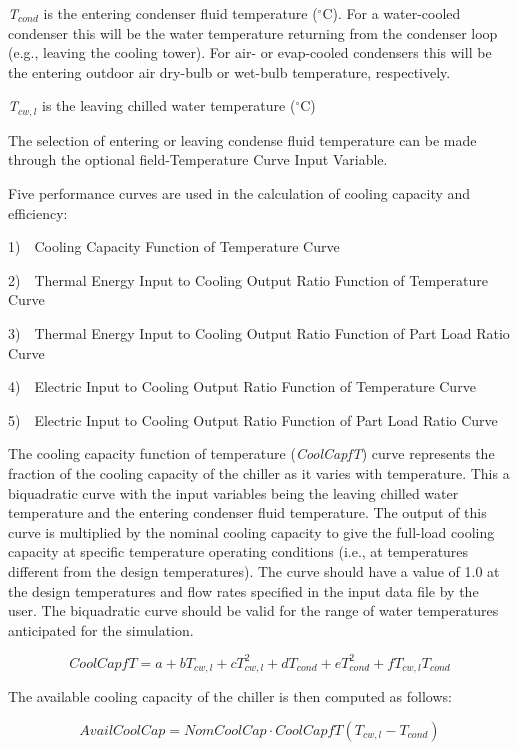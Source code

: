 \emph{T\(_{cond}\)} is the entering condenser fluid temperature (\(^{\circ}\)C). For a water-cooled condenser this will be the water temperature returning from the condenser loop (e.g., leaving the cooling tower). For air- or evap-cooled condensers this will be the entering outdoor air dry-bulb or wet-bulb temperature, respectively.

\emph{T\(_{cw,l}\)} is the leaving chilled water temperature (\(^{\circ}\)C)

The selection of entering or leaving condense fluid temperature can be made through the optional field-Temperature Curve Input Variable.

Five performance curves are used in the calculation of cooling capacity and efficiency:

1)~~Cooling Capacity Function of Temperature Curve

2)~~Thermal Energy Input to Cooling Output Ratio Function of Temperature Curve

3)~~Thermal Energy Input to Cooling Output Ratio Function of Part Load Ratio Curve

4)~~Electric Input to Cooling Output Ratio Function of Temperature Curve

5)~~Electric Input to Cooling Output Ratio Function of Part Load Ratio Curve

The cooling capacity function of temperature (\emph{CoolCapfT}) curve represents the fraction of the cooling capacity of the chiller as it varies with temperature. This a biquadratic curve with the input variables being the leaving chilled water temperature and the entering condenser fluid temperature. The output of this curve is multiplied by the nominal cooling capacity to give the full-load cooling capacity at specific temperature operating conditions (i.e., at temperatures different from the design temperatures). The curve should have a value of 1.0 at the design temperatures and flow rates specified in the input data file by the user. The biquadratic curve should be valid for the range of water temperatures anticipated for the simulation.

\begin{equation}
CoolCapfT = a + b{T_{cw,l}} + cT_{cw,l}^2 + d{T_{cond}} + eT_{cond}^2 + f{T_{cw,l}}{T_{cond}}
\end{equation}

The available cooling capacity of the chiller is then computed as follows:

\begin{equation}
AvailCoolCap = NomCoolCap \cdot CoolCapfT({T_{cw,l}} - {T_{cond}})
\end{equation}

